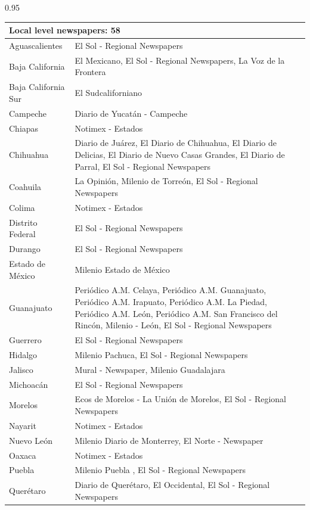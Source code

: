 \documentclass[12pt,letterpaper]{article}
\begin{document}
\begin{table}[h!]
\begin{spacing}{0.95}
\begin{tabular}{|ll|}
\multicolumn{2}{|l|}{\textbf{Local level newspapers: 58  }}     \\
\hline
Aguascalientes  &  El Sol - Regional Newspapers   \\
Baja California  &  \multicolumn{1}{p{11cm}|}{El Mexicano,  El Sol - Regional Newspapers,  La Voz de la Frontera}   \\
Baja California Sur  &  El Sudcaliforniano   \\
Campeche  &  Diario de Yucat\'{a}n - Campeche   \\
Chiapas  &  Notimex - Estados  \\
Chihuahua  &  \multicolumn{1}{p{11cm}|}{Diario de Ju\'{a}rez, El Diario de Chihuahua,  El Diario de Delicias, El Diario de Nuevo Casas Grandes,  El Diario de Parral, El Sol - Regional Newspapers }  \\
Coahuila   &  La Opini\'{o}n, Milenio de Torre\'{o}n, El Sol - Regional Newspapers   \\
Colima  &  Notimex - Estados \\
Distrito Federal  &  El Sol - Regional Newspapers   \\
Durango  &  El Sol - Regional Newspapers   \\
Estado de M\'{e}xico  &  Milenio Estado de M\'{e}xico   \\
Guanajuato  &  \multicolumn{1}{p{11cm}|}{Peri\'{o}dico A.M. Celaya, Peri\'{o}dico A.M. Guanajuato, Peri\'{o}dico A.M. Irapuato, Peri\'{o}dico A.M. La Piedad,  Peri\'{o}dico A.M. Le\'{o}n, Peri\'{o}dico A.M. San Francisco del Rinc\'{o}n,  Milenio - Le\'{o}n, El Sol - Regional Newspapers }  \\
Guerrero  &  El Sol - Regional Newspapers   \\
Hidalgo  &  Milenio Pachuca, El Sol - Regional Newspapers   \\
Jalisco  &  Mural - Newspaper,  Milenio Guadalajara   \\
Michoac\'{a}n  &  El Sol - Regional Newspapers   \\
Morelos  &  \multicolumn{1}{p{11cm}|}{Ecos de Morelos - La Uni\'{o}n de Morelos, El Sol - Regional Newspapers }  \\
Nayarit  &  Notimex - Estados \\
Nuevo Le\'{o}n  &  Milenio Diario de Monterrey,  El Norte - Newspaper   \\
Oaxaca  &  Notimex - Estados \\
Puebla  &  Milenio Puebla , El Sol - Regional Newspapers   \\
Quer\'{e}taro  &  \multicolumn{1}{p{11cm}|}{Diario de Quer\'{e}taro, El Occidental,  El Sol - Regional Newspapers }  \\

\end{tabular}
\end{spacing}
\end{table}
\end{document}
